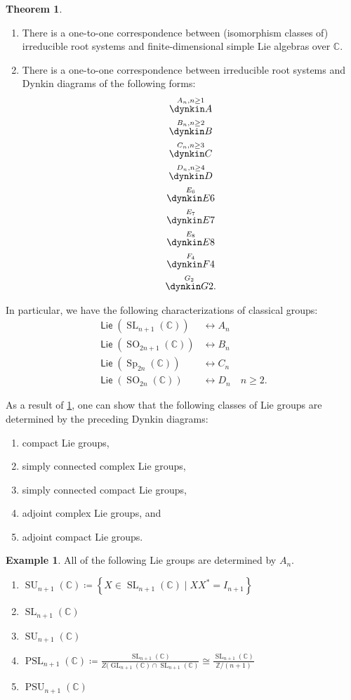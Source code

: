 \documentclass[10pt,letterpaper,cm]{nupset}
\theoremstyle{definition}
\newtheorem{exmp}[defn]{Example}
\theoremstyle{theorem}
\newtheorem{theorem}[defn]{Theorem}
\theoremstyle{remark}
\newcommand{\C}{\mathbb C}
\newcommand{\Z}{\mathbb Z}
\newcommand{\1}{\mathbb{1}}
\newcommand{\0}{\vec 0}
\DeclareMathOperator{\Sp}{Sp}
\DeclareMathOperator{\SU}{SU}
\DeclareMathOperator{\GL}{GL}
\DeclareMathOperator{\SL}{SL}
\DeclareMathOperator{\SO}{SO}
\DeclareMathOperator{\psl}{PSL}
\DeclareMathOperator{\psu}{PSU}
\DeclareMathOperator{\lie}{\mathsf{Lie}}
\newcommand{\be}{\begin{enumerate}}
\newcommand{\ee}{\end{enumerate}}
\begin{document}
\begin{theorem}\label{Dynkin} $ $
\be
\item There is a one-to-one correspondence between (isomorphism classes of) irreducible root systems and finite-dimensional simple Lie algebras over $\C$.
\item There is a one-to-one correspondence between  irreducible root systems and Dynkin diagrams of the following forms: 
\pagebreak
\begin{gather*}
 \overset{A_n, n\geq 1}{\dynkin A{}}
\\
\overset{B_n, n\geq 2}{\dynkin B{}}
\\
\overset{C_n, n\geq 3}{\dynkin C{}}
\\
\overset{D_n, n\geq 4}{\dynkin D{}}
\\ 
\overset{E_6}{\dynkin E6}
\\
\overset{E_7}{\dynkin E7}
\\
\overset{E_8}{\dynkin E8}
\\
\overset{F_4}{\dynkin F4}
\\
\overset{G_2}{\dynkin G2}
.\end{gather*}
\ee
\end{theorem}

In particular, we have the following characterizations of classical groups: 
\begin{align*}
\lie(\SL_{n+1}(\C))  & \longleftrightarrow  A_n
\\
\lie(\SO_{2n+1}(\C) ) & \longleftrightarrow B_n
\\
\lie(\Sp_{2n}(\C))  & \longleftrightarrow C_n
\\
\lie(\SO_{2n}(\C))   & \longleftrightarrow D_n  \quad n\geq 2.
\end{align*}

\smallskip

As a result of \cref{Dynkin}, one can show that the following classes of Lie groups are determined by the preceding Dynkin diagrams:
\be[label=(\alph*)]
\item compact Lie groups,
\item simply connected complex Lie groups,
\item simply connected compact Lie groups,
\item adjoint complex Lie groups, and
\item adjoint compact Lie groups.
\ee

\begin{exmp}
All of the following Lie groups are determined by $A_n$.
\be[label=(\alph*)]
\item $\SU_{n+1}(\C) \coloneqq \left\{X\in \SL_{n+1}(\C) \mid XX^{\ast} = I_{n+1}\right\}$
\item $\SL_{n+1}(\C)$
\item $\SU_{n+1}(\C)$
\item $\psl_{n+1}(\C)\coloneqq  \frac{\SL_{n+1}(\C)}{Z(\GL_{n+1}(\C)\cap \SL_{n+1}(\C)} \cong \frac{\SL_{n+1}(\C)}{\Z/\left(n+1\right)}$
\item $\psu_{n+1}(\C)$
\ee
\end{exmp}
\end{document}
